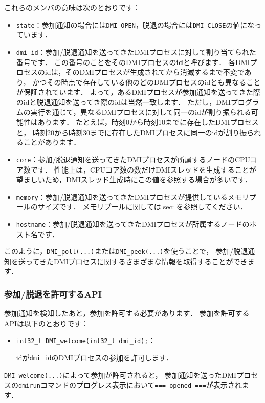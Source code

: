 \documentclass[report,12pt]{jsbook}
\begin{document}
これらのメンバの意味は次のとおりです：

\begin{itemize}
\item \texttt{state}：参加通知の場合には\texttt{DMI\_OPEN}，脱退の場合には\texttt{DMI\_CLOSE}の値になっています．
\item \texttt{dmi\_id}：参加/脱退通知を送ってきたDMIプロセスに対して割り当てられた番号です．
  この番号のことをそのDMIプロセスの\textbf{id}と呼びます．
  各DMIプロセスのidは，そのDMIプロセスが生成されてから消滅するまで不変であり，
  かつその時点で存在している他のどのDMIプロセスのidとも異なることが保証されています．
  よって，あるDMIプロセスが参加通知を送ってきた際のidと脱退通知を送ってき際のidは当然一致します．
  ただし，DMIプログラムの実行を通じて，異なるDMIプロセスに対して同一のidが割り振られる可能性はあります．
  たとえば，時刻0から時刻10までに存在したDMIプロセスと，
  時刻20から時刻30までに存在したDMIプロセスに同一のidが割り振られることがあります．
\item \texttt{core}：参加/脱退通知を送ってきたDMIプロセスが所属するノードのCPUコア数です．
  性能上は，CPUコア数の数だけDMIスレッドを生成することが望ましいため，DMIスレッド生成時にこの値を参照する場合が多いです．
\item \texttt{memory}：参加/脱退通知を送ってきたDMIプロセスが提供しているメモリプールのサイズです．
  メモリプールに関しては\ref{sec:}を参照してください．
\item \texttt{hostname}：参加/脱退通知を送ってきたDMIプロセスが所属するノードのホスト名です．
\end{itemize}

このように，\texttt{DMI\_poll(...)}または\texttt{DMI\_peek(...)}を使うことで，
参加/脱退通知を送ってきたDMIプロセスに関するさまざまな情報を取得することができます．


\subsubsection{参加/脱退を許可するAPI}

参加通知を検知したあと，参加を許可する必要があります．
参加を許可するAPIは以下のとおりです：

\begin{itemize}
\item \texttt{int32\_t DMI\_welcome(int32\_t dmi\_id);}：
  
  idが\texttt{dmi\_id}のDMIプロセスの参加を許可します．
\end{itemize}

\texttt{DMI\_welcome(...)}によって参加が許可されると，
参加通知を送ったDMIプロセスの\texttt{dmirun}コマンドのプログレス表示において\texttt{=== opened ===}が表示されます．
\end{document}
